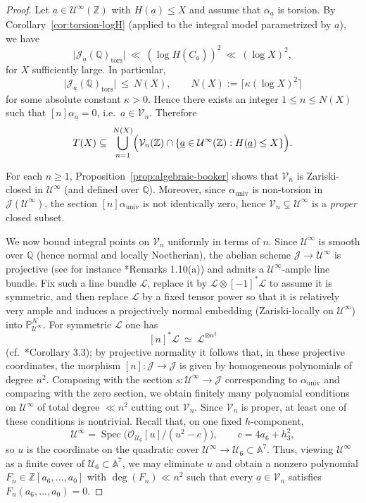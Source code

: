 \documentclass{amsart}
\newcommand{\Q}{{\mathbb Q}}
\newcommand{\Z}{{\mathbb Z}}
\newcommand{\cJ}{\mathcal{J}}
\newcommand{\cV}{\mathcal{V}}
\newcommand{\cU}{\mathcal{U}}
\newcommand{\A}{\mathbb{A}}
\newcommand{\Ht}{H}
\newcommand{\ua}{\underline{a}}
\begin{document}
\begin{proof}
Let $\ua\in \cU^{\infty}(\Z)$ with $\Ht(\ua)\le X$ and assume that $\alpha_{\ua}$ is torsion.
By Corollary~\ref{cor:torsion-logH} (applied to the integral model parametrized by $\ua$), we have
\[
\bigl|\cJ_{\ua}(\Q)_{\mathrm{tors}}\bigr|\ \ll\ (\log H(C_{\ua}))^{2}\ \ll\ (\log X)^{2},
\]
for $X$ sufficiently large. In particular,
\[
\bigl|\cJ_{\ua}(\Q)_{\mathrm{tors}}\bigr|\ \le\ N(X),
\qquad
N(X):=\bigl\lceil \kappa(\log X)^{2}\bigr\rceil
\]
for some absolute constant $\kappa>0$. Hence there exists an integer $1\le n\le N(X)$ such that
$[n]\alpha_{\ua}=0$, i.e.\ $\ua\in \cV_{n}$. Therefore
\begin{equation}\label{eq:T-in-union-Vn}
T(X) \subseteq\ \bigcup_{n=1}^{N(X)}\Bigl(\cV_{n}(\Z)\cap\{\ua\in\cU^{\infty}(\Z):\Ht(\ua)\le X\}\Bigr).
\end{equation}

For each $n\ge 1$, Proposition~\ref{prop:algebraic-booker} shows that $\cV_{n}$ is Zariski-closed in
$\cU^{\infty}$ (and defined over $\Q$). Moreover, since $\alpha_{\mathrm{univ}}$ is non-torsion in
$\cJ(\cU^{\infty})$, the section $[n]\alpha_{\mathrm{univ}}$ is not identically zero, hence
$\cV_{n}\subsetneq \cU^{\infty}$ is a \emph{proper} closed subset.

We now bound integral points on $\cV_{n}$ uniformly in terms of $n$.
Since $\cU^{\infty}$ is smooth over $\Q$ (hence normal and locally Noetherian), the abelian scheme
$\mathcal J\to \cU^{\infty}$ is projective (see for instance \cite{FaltingsChai}*{Remarks 1.10(a)}) and admits a $\cU^{\infty}$-ample line bundle. Fix such a line bundle $\mathcal L$, replace it by
$\mathcal L\otimes[-1]^{*}\mathcal L$ to assume it is symmetric, and then replace $\mathcal L$ by a fixed
tensor power so that it is relatively very ample and induces a projectively normal embedding
(Zariski-locally on $\cU^{\infty}$) into $\mathbb P^{N}_{\cU^{\infty}}$.
For symmetric $\mathcal L$ one has
\[
[n]^{*}\mathcal L \ \simeq\ \mathcal L^{\otimes n^{2}}
\]
(cf.\ \cite{LombardoNotes}*{Corollary 3.3}); by projective normality it follows that, in these projective
coordinates, the morphism $[n]:\mathcal J\to\mathcal J$ is given by homogeneous polynomials of degree $n^{2}$.
Composing with the section $s:\cU^{\infty}\to\mathcal J$ corresponding to $\alpha_{\mathrm{univ}}$ and comparing
with the zero section, we obtain finitely many polynomial conditions on $\cU^{\infty}$ of total degree $\ll n^{2}$
cutting out $\cV_{n}$. Since $\cV_{n}$ is proper, at least one of these conditions is nontrivial. Recall that, on one fixed \(h\)-component,
\[
   \cU^\infty
   = \operatorname{Spec}\bigl(\mathcal O_{\mathcal U_6}[u]/(u^2-c)\bigr),
   \qquad c=4a_6+h_3^2,
\]
so \(u\) is the coordinate on the quadratic cover
\(\cU^\infty \to \mathcal U_6 \subset \mathbb A^7\). Thus, viewing
$\cU^{\infty}$ as a finite cover of $\cU_{6}\subset \A^{7}$, we may eliminate $u$ and obtain a nonzero polynomial
$F_{n}\in \Z[a_{6},\dots,a_{0}]$ with $\deg(F_{n})\ll n^{2}$ such that every $\ua\in \cV_{n}$ satisfies
$F_{n}(a_{6},\dots,a_{0})=0$.


\end{proof}
\end{document}

